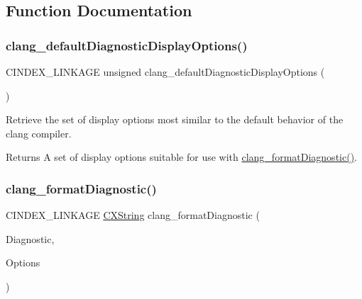 \subsection{Function Documentation}
\mbox{\label{group__CINDEX__DIAG_ga5fcf910792541399efd63c62042ce353}} 
\subsubsection{\texorpdfstring{clang\+\_\+default\+Diagnostic\+Display\+Options()}{clang\_defaultDiagnosticDisplayOptions()}}
{\footnotesize\ttfamily C\+I\+N\+D\+E\+X\+\_\+\+L\+I\+N\+K\+A\+GE unsigned clang\+\_\+default\+Diagnostic\+Display\+Options (\begin{DoxyParamCaption}\item[{void}]{ }\end{DoxyParamCaption})}



Retrieve the set of display options most similar to the default behavior of the clang compiler. 

\begin{DoxyReturn}{Returns}
A set of display options suitable for use with {\ttfamily \hyperlink{group__CINDEX__DIAG_ga455234ab6de0ca12c9ea36f8874060e8}{clang\+\_\+format\+Diagnostic()}}. 
\end{DoxyReturn}
\mbox{\label{group__CINDEX__DIAG_ga455234ab6de0ca12c9ea36f8874060e8}} 
\subsubsection{\texorpdfstring{clang\+\_\+format\+Diagnostic()}{clang\_formatDiagnostic()}}
{\footnotesize\ttfamily C\+I\+N\+D\+E\+X\+\_\+\+L\+I\+N\+K\+A\+GE \hyperlink{structCXString}{C\+X\+String} clang\+\_\+format\+Diagnostic (\begin{DoxyParamCaption}\item[{\hyperlink{group__CINDEX__DIAG_ga44bb8aba7c40590ad25d1763c4fbff7f}{C\+X\+Diagnostic}}]{Diagnostic,  }\item[{unsigned}]{Options }\end{DoxyParamCaption})}



